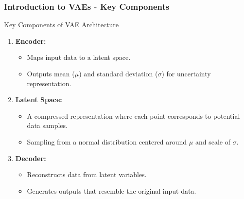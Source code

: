 \documentclass[aspectratio=169]{beamer}
\begin{document}
\begin{frame}[fragile]
    \frametitle{Introduction to VAEs - Key Components}
    \begin{block}{Key Components of VAE Architecture}
        \begin{enumerate}
            \item \textbf{Encoder:}
                \begin{itemize}
                    \item Maps input data to a latent space.
                    \item Outputs mean ($\mu$) and standard deviation ($\sigma$) for uncertainty representation.
                \end{itemize}
            \item \textbf{Latent Space:}
                \begin{itemize}
                    \item A compressed representation where each point corresponds to potential data samples.
                    \item Sampling from a normal distribution centered around $\mu$ and scale of $\sigma$.
                \end{itemize}
            \item \textbf{Decoder:}
                \begin{itemize}
                    \item Reconstructs data from latent variables.
                    \item Generates outputs that resemble the original input data.
                \end{itemize}
        \end{enumerate}
    \end{block}
\end{frame}
\end{document}
